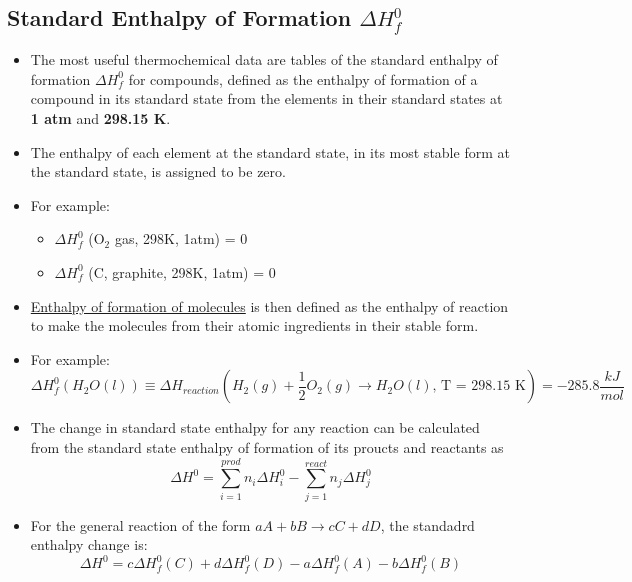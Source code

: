 \documentclass[10pt]{article}
\begin{document}
\subsection*{Standard Enthalpy of Formation $\Delta H^0_f$}
\begin{itemize}
    \item The most useful thermochemical data are tables of the standard enthalpy of formation $\Delta H_f^0$ for compounds, defined as the enthalpy of formation of a compound in its standard state from the elements in their standard states at \textbf{1 atm} and \textbf{298.15 K}.
    \item The enthalpy of each element at the standard state, in its most stable form at the standard state, is assigned to be zero.
    \item For example:
    \begin{itemize}
        \item $\Delta H^0_f$ (O$_2$ gas, 298K, 1atm) = 0
        \item $\Delta H^0_f$ (C, graphite, 298K, 1atm) = 0
    \end{itemize}
    \item \underline{Enthalpy of formation of molecules} is then defined as the enthalpy of reaction to make the molecules from their atomic ingredients in their stable form.
    \item For example:
    \[\Delta H^0_f(H_2O(l)) \equiv \Delta H_{reaction}\left(H_2(g) + \frac{1}{2}O_2(g) \rightarrow H_2O(l)\text{, T = 298.15 K}\right) = -285.8 \frac{kJ}{mol}\]
    \item The change in standard state enthalpy for any reaction can be calculated from the standard state enthalpy of formation of its proucts and reactants as
    \[\Delta H^0 = \sum_{i = 1}^{prod} n_i \Delta H_i^0 - \sum_{j = 1}^{react} n_j \Delta H_j^0\]
    \item For the general reaction of the form $aA + bB \rightarrow cC + dD$, the standadrd enthalpy change is:
    \[\Delta H^0 = c\Delta H_f^0(C) + d\Delta H_f^0(D) - a\Delta H_f^0(A) - b\Delta H_f^0(B)\]
\end{itemize}
\end{document}
